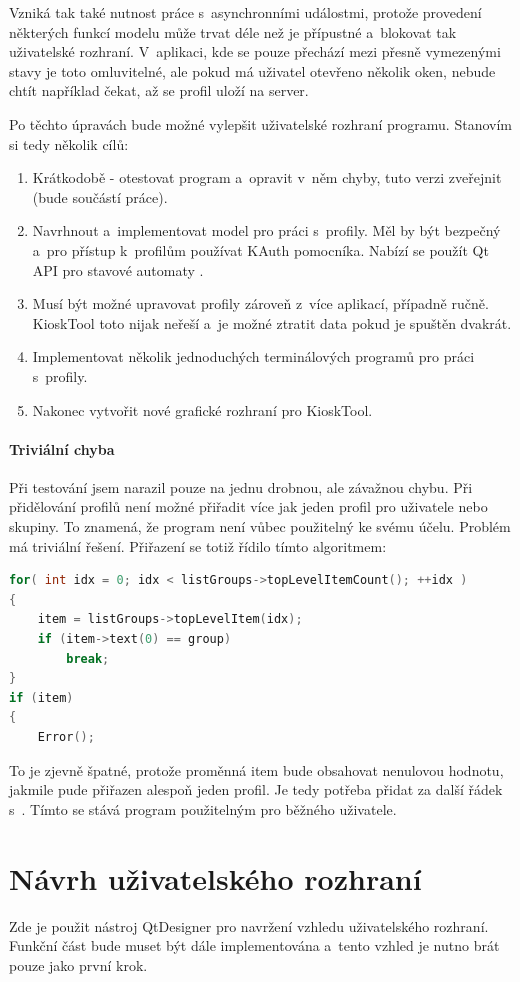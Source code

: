 Vzniká tak také nutnost práce s~asynchronními událostmi, protože provedení některých funkcí modelu může trvat déle než je přípustné a~blokovat tak uživatelské rozhraní. V~aplikaci, kde se pouze přechází mezi přesně vymezenými stavy je toto omluvitelné, ale pokud má uživatel otevřeno několik oken, nebude chtít například čekat, až se profil uloží na server.

Po těchto úpravách bude možné vylepšit uživatelské rozhraní programu. Stanovím si tedy několik cílů:
\begin{enumerate}
\item Krátkodobě - otestovat program a~opravit v~něm chyby, tuto verzi zveřejnit (bude součástí práce).
\item Navrhnout a~implementovat model pro práci s~profily. Měl by být bezpečný a~pro přístup k~profilům používat KAuth pomocníka. Nabízí se použít Qt API pro stavové automaty \cite{QtStatMach}.
\item Musí být možné upravovat profily zároveň z~více aplikací, případně ručně. KioskTool toto nijak neřeší a~je možné ztratit data pokud je spuštěn dvakrát.
\item Implementovat několik jednoduchých terminálových programů pro práci s~profily.
\item Nakonec vytvořit nové grafické rozhraní pro KioskTool.
\end{enumerate}

\paragraph{Triviální chyba}
Při testování jsem narazil pouze na jednu drobnou, ale závažnou chybu. Při přidělování profilů není možné přiřadit více jak jeden profil pro uživatele nebo skupiny. To znamená, že program není vůbec použitelný ke svému účelu. Problém má triviální řešení. Přiřazení se totiž řídilo tímto algoritmem:
\begin{lstlisting}[language=C++]
for( int idx = 0; idx < listGroups->topLevelItemCount(); ++idx )
{
    item = listGroups->topLevelItem(idx);
    if (item->text(0) == group)
        break;
}
if (item)
{
    Error();
\end{lstlisting}
To je zjevně špatné, protože proměnná item bude obsahovat nenulovou hodnotu, jakmile pude přiřazen alespoň jeden profil. Je tedy potřeba přidat za  další řádek s~. Tímto se stává program použitelným pro běžného uživatele.

\section{Návrh uživatelského rozhraní}
Zde je použit nástroj QtDesigner pro navržení vzhledu uživatelského rozhraní. Funkční část bude muset být dále implementována a~tento vzhled je nutno brát pouze jako první krok.

